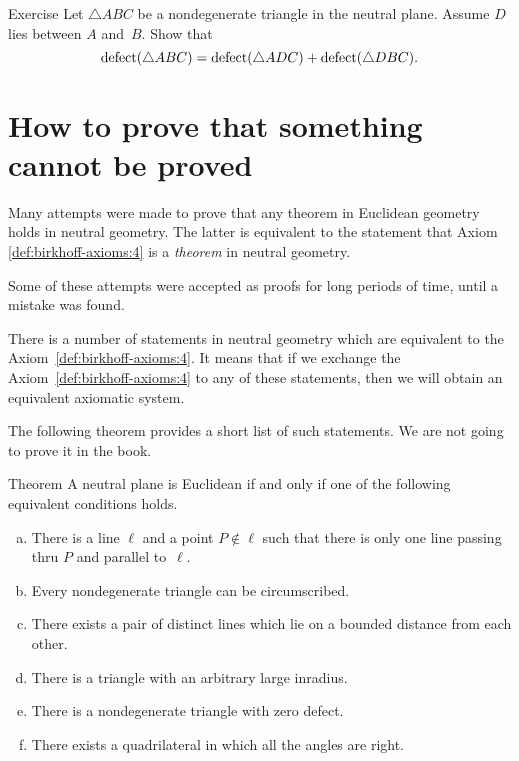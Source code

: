 \begin{thm}{Exercise}\label{ex:defect}
Let $\triangle ABC$ be a nondegenerate triangle in the neutral plane.
Assume $D$ lies between $A$ and~$B$.
Show that 
$$\mathop{\rm defect}\nolimits(\triangle ABC)=\mathop{\rm defect}\nolimits(\triangle ADC)+\mathop{\rm defect}\nolimits(\triangle DBC).$$

\end{thm}



\section*{How to prove that something\\ 
cannot be proved}

Many attempts were made to prove that any theorem in Euclidean geometry holds in neutral geometry.
The latter is equivalent to the statement that Axiom \ref{def:birkhoff-axioms:4} is a {}\emph{theorem} in neutral geometry.

Some of these attempts were accepted as proofs for long periods of time, until a mistake was found.

There is a number of statements in neutral geometry which are equivalent to the Axiom~\ref{def:birkhoff-axioms:4}.
It means that if we exchange the Axiom~\ref{def:birkhoff-axioms:4}  to any of these statements, then we will obtain an equivalent axiomatic system.

The following theorem provides a short list of such statements.
We are not going to prove it in the book.

\begin{thm}{Theorem}\label{thm:=IV}
A neutral plane is Euclidean if and only if one of the following equivalent conditions holds.
\begin{enumerate}[(a)]
\item\label{thm:=IV:main} 
There is a line $\ell$ 
and a point $P\notin\ell$ 
such that there is only one line passing thru $P$ 
and parallel to~$\ell$.
\item 
Every nondegenerate triangle can be circumscribed.
\item
There exists a pair of distinct lines which lie on a bounded distance from each other.
\item
There is a triangle with an arbitrary large inradius.
\item
There is a nondegenerate triangle with zero defect.
\item
There exists a quadrilateral in which all the angles are right.
\end{enumerate}
\end{thm}

